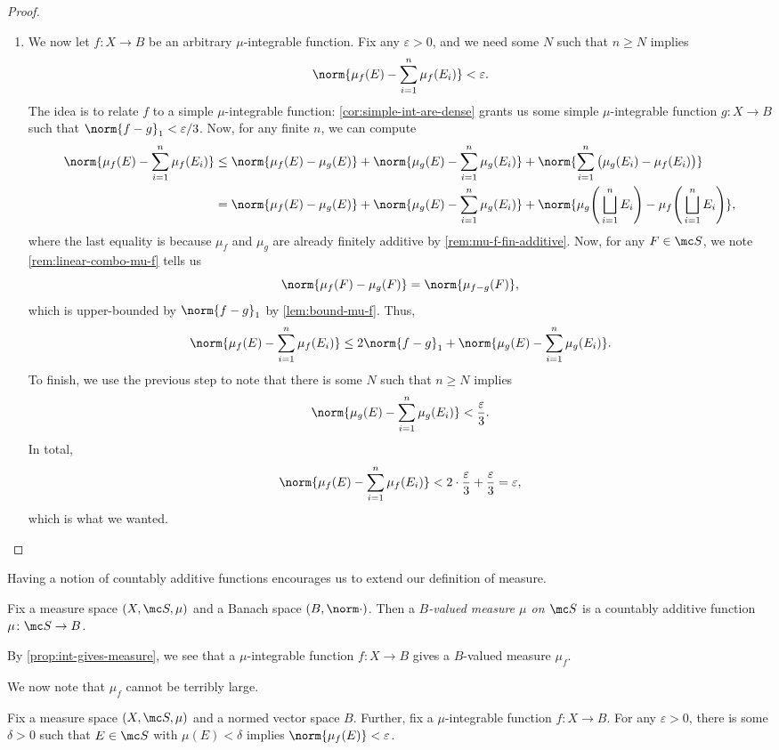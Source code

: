 \documentclass[../notes.tex]{subfiles}
\begin{document}
\begin{proof}
\begin{enumerate}
		\item We now let $f\colon X\to B$ be an arbitrary $\mu$-integrable function. Fix any $\varepsilon>0$, and we need some $N$ such that $n\ge N$ implies
		\[\norm{\mu_f(E)-\sum_{i=1}^n\mu_f(E_i)}<\varepsilon.\]
		The idea is to relate $f$ to a simple $\mu$-integrable function: \autoref{cor:simple-int-are-dense} grants us some simple $\mu$-integrable function $g\colon X\to B$ such that $\norm{f-g}_1<\varepsilon/3$. Now, for any finite $n$, we can compute
		\begin{align*}
			\norm{\mu_f(E)-\sum_{i=1}^n\mu_f(E_i)} &\le \norm{\mu_f(E)-\mu_g(E)} + \norm{\mu_g(E)-\sum_{i=1}^n\mu_g(E_i)}+\norm{\sum_{i=1}^n\big(\mu_g(E_i)-\mu_f(E_i)\big)} \\
			&= \norm{\mu_f(E)-\mu_g(E)}+\norm{\mu_g(E)-\sum_{i=1}^n\mu_g(E_i)}+\norm{\mu_g\Bigg(\bigsqcup_{i=1}^nE_i\Bigg)-\mu_f\Bigg(\bigsqcup_{i=1}^nE_i\Bigg)},
		\end{align*}
		where the last equality is because $\mu_f$ and $\mu_g$ are already finitely additive by \autoref{rem:mu-f-fin-additive}. Now, for any $F\in\mc S$, we note \autoref{rem:linear-combo-mu-f} tells us
		\[\norm{\mu_f(F)-\mu_g(F)}=\norm{\mu_{f-g}(F)},\]
		which is upper-bounded by $\norm{f-g}_1$ by \autoref{lem:bound-mu-f}. Thus,
		\[\norm{\mu_f(E)-\sum_{i=1}^n\mu_f(E_i)}\le2\norm{f-g}_1+\norm{\mu_g(E)-\sum_{i=1}^n\mu_g(E_i)}.\]
		To finish, we use the previous step to note that there is some $N$ such that $n\ge N$ implies
		\[\norm{\mu_g(E)-\sum_{i=1}^n\mu_g(E_i)}<\frac\varepsilon3.\]
		In total,
		\[\norm{\mu_f(E)-\sum_{i=1}^n\mu_f(E_i)}<2\cdot\frac\varepsilon3+\frac\varepsilon3=\varepsilon,\]
		which is what we wanted.
		\qedhere
	\end{enumerate}
\end{proof}
Having a notion of countably additive functions encourages us to extend our definition of measure.
\begin{definition}[Measure]
	Fix a measure space $(X,\mc S,\mu)$ and a Banach space $(B,\norm\cdot)$. Then a \textit{$B$-valued measure $\mu$ on $\mc S$} is a countably additive function $\mu\colon\mc S\to B$.
\end{definition}
\begin{example}
	By \autoref{prop:int-gives-measure}, we see that a $\mu$-integrable function $f\colon X\to B$ gives a $B$-valued measure $\mu_f$.
\end{example}
We now note that $\mu_f$ cannot be terribly large.
\begin{lemma} \label{lem:int-measure-is-continuous}
	Fix a measure space $(X,\mc S,\mu)$ and a normed vector space $B$. Further, fix a $\mu$-integrable function $f\colon X\to B$. For any $\varepsilon>0$, there is some $\delta>0$ such that $E\in\mc S$ with $\mu(E)<\delta$ implies $\norm{\mu_f(E)}<\varepsilon$.
\end{lemma}
\end{document}
